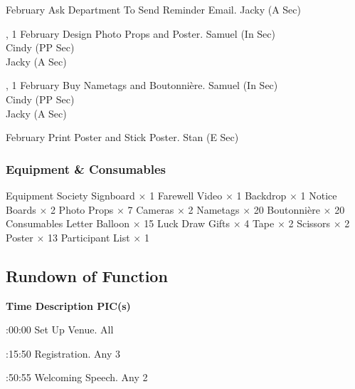 \bTR{}
\eTD{} February
\eTD\bTD Ask Department To Send Reminder Email.
\eTD\bTD Jacky (A Sec)
\eTD\eTR

\bTR{}, 1
\eTD{} February
\eTD\bTD Design Photo Props and Poster.
\eTD\bTD Samuel (In Sec) \\ Cindy (PP Sec) \\ Jacky (A Sec)
\eTD\eTR

\bTR{}, 1
\eTD{} February
\eTD\bTD Buy Nametags and Boutonnière.
\eTD\bTD Samuel (In Sec) \\ Cindy (PP Sec) \\ Jacky (A Sec)
\eTD\eTR

\bTR{}
\eTD{} February
\eTD\bTD Print Poster and Stick Poster.
\eTD\bTD Stan (E Sec)
\eTD\eTR

\eTABLEbody
\eTABLE

\subsubsection{Equipment \& Consumables}
\starttabulate[|l|l|]
\NC{}Equipment\NC\NR
\HL
\NC Society Signboard \NC $\times$ 1 \NR
\NC Farewell Video \NC $\times$ 1 \NR
\NC Backdrop \NC $\times$ 1 \NR
\NC Notice Boards \NC $\times$ 2 \NR
\NC Photo Props \NC $\times$ 7 \NR
\NC Cameras \NC $\times$ 2 \NR
\NC Nametags \NC $\times$ 20 \NR
\NC Boutonnière \NC $\times$ 20 \NR
\HL
\NR
\NC{}Consumables\NC\NR
\HL
\NC Letter Balloon \NC $\times$ 15 \NR
\NC Luck Draw Gifts \NC $\times$ 4 \NR
\NC Tape \NC $\times$ 2 \NR
\NC Scissors \NC $\times$ 2 \NR
\NC Poster \NC $\times$ 13 \NR
\NC Participant List \NC $\times$ 1 \NR
\HL
\stoptabulate

\subsection{Rundown of Function}

\setupTABLE[c][1][width=1.25in]
\setupTABLE[c][2][width=3.5in]
\setupTABLE[c][3][width=1.25in]
\bTABLE
\bTABLEhead

\bTR\bTH    \bf{Time}
\eTH\bTH    \bf{Description}
\eTH\bTH    \bf{PIC(s)}
\eTH\eTR

\eTABLEhead
\bTABLEbody

\bTR{}:00:00
\eTD\bTD Set Up Venue.
\eTD\bTD All
\eTD\eTR

\bTR{}:15:50
\eTD\bTD Registration.
\eTD\bTD Any 3
\eTD\eTR

\bTR{}:50:55
\eTD\bTD Welcoming Speech.
\eTD\bTD Any 2
\eTD\eTR

